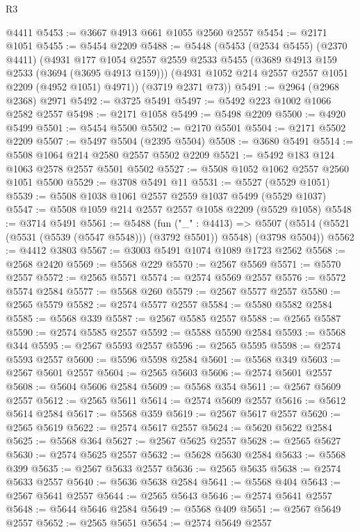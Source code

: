 \begin{lexlean}{R3}
\begin{coremodule}
    @4411
@5453 := @3667 @4913 @661 @1055 @2560 @2557
@5454 := @2171 @1051
@5455 := @5454 @2209
@5488 := @5448
    (@5453
      (@2534 @5455)
      (@2370 @4411)
      (@4931
        @177
        @1054
        @2557
        @2559
        @2533
        @5455
        (@3689 @4913 @159 @2533 (@3694 (@3695 @4913 @159)))
        (@4931 @1052 @214 @2557 @2557 @1051 @2209 (@4952 @1051) @4971))
      (@3719 @2371 @73))
@5491 := @2964 (@2968 @2368) @2971
@5492 := @3725 @5491
@5497 := @5492 @223 @1002 @1066 @2582 @2557
@5498 := @2171 @1058
@5499 := @5498 @2209
@5500 := @4920 @5499
@5501 := @5454 @5500
@5502 := @2170 @5501
@5504 := @2171 @5502 @2209
@5507 := @5497 @5504 (@2395 @5504)
@5508 := @3680 @5491
@5514 := @5508 @1064 @214 @2580 @2557 @5502 @2209
@5521 := @5492 @183 @124 @1063 @2578 @2557 @5501 @5502
@5527 := @5508 @1052 @1062 @2557 @2560 @1051 @5500
@5529 := @3708 @5491 @11
@5531 := @5527 (@5529 @1051)
@5539 := @5508 @1038 @1061 @2557 @2559 @1037 @5499 (@5529 @1037)
@5547 := @5508 @1059 @214 @2557 @2557 @1058 @2209 (@5529 @1058)
@5548 := @3714 @5491
@5561 := @5488
    (fun ("_" : @4413) =>
    @5507 (@5514 (@5521 (@5531 (@5539 (@5547 @5548))) (@3792 @5501)) @5548) (@3798 @5504))
@5562 := @4412 @3803
@5567 := @3003 @5491 @1074 @1089 @1723 @2562
@5568 := @2568 @2420
@5569 := @5568 @229
@5570 := @2567 @5569
@5571 := @5570 @2557
@5572 := @2565 @5571
@5574 := @2574 @5569 @2557
@5576 := @5572 @5574 @2584
@5577 := @5568 @260
@5579 := @2567 @5577 @2557
@5580 := @2565 @5579
@5582 := @2574 @5577 @2557
@5584 := @5580 @5582 @2584
@5585 := @5568 @339
@5587 := @2567 @5585 @2557
@5588 := @2565 @5587
@5590 := @2574 @5585 @2557
@5592 := @5588 @5590 @2584
@5593 := @5568 @344
@5595 := @2567 @5593 @2557
@5596 := @2565 @5595
@5598 := @2574 @5593 @2557
@5600 := @5596 @5598 @2584
@5601 := @5568 @349
@5603 := @2567 @5601 @2557
@5604 := @2565 @5603
@5606 := @2574 @5601 @2557
@5608 := @5604 @5606 @2584
@5609 := @5568 @354
@5611 := @2567 @5609 @2557
@5612 := @2565 @5611
@5614 := @2574 @5609 @2557
@5616 := @5612 @5614 @2584
@5617 := @5568 @359
@5619 := @2567 @5617 @2557
@5620 := @2565 @5619
@5622 := @2574 @5617 @2557
@5624 := @5620 @5622 @2584
@5625 := @5568 @364
@5627 := @2567 @5625 @2557
@5628 := @2565 @5627
@5630 := @2574 @5625 @2557
@5632 := @5628 @5630 @2584
@5633 := @5568 @399
@5635 := @2567 @5633 @2557
@5636 := @2565 @5635
@5638 := @2574 @5633 @2557
@5640 := @5636 @5638 @2584
@5641 := @5568 @404
@5643 := @2567 @5641 @2557
@5644 := @2565 @5643
@5646 := @2574 @5641 @2557
@5648 := @5644 @5646 @2584
@5649 := @5568 @409
@5651 := @2567 @5649 @2557
@5652 := @2565 @5651
@5654 := @2574 @5649 @2557

\end{coremodule}
\end{lexlean}
